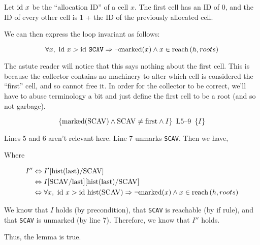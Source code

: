 Let $\id~x$ be the ``allocation ID'' of a cell $x$. The first cell has
an ID of 0, and the ID of every other cell is 1 + the ID of the
previously allocated cell.

We can then express the loop invariant as follows:

\[\forall x,\ \id~x > \id~\mathtt{SCAV} \implies
\lnot \mathrm{marked}(x) \land x \in \reach{h}{roots}\]

The astute reader will notice that this says nothing about the first
cell. This is because the collector contains no machinery to alter
which cell is considered the ``first'' cell, and so cannot free it. In
order for the collector to be correct, we'll have to abuse terminology
a bit and just define the first cell to be a root (and so not
garbage).


\begin{lemma}
  \label{lem:erlang1}
  \[\htriple{\mathrm{marked}(\mathrm{SCAV}) \land \mathrm{SCAV} \neq
    \mathrm{first} \land I}{L5--9}{I}\]

  Lines 5 and 6 aren't relevant here. Line 7 unmarks
  \texttt{SCAV}. Then we have,

  \begin{prooftree}
  \end{prooftree}

  Where

  \begin{align*}
    I'' &\iff I'[\mathrm{hist}(\mathrm{last})/\mathrm{SCAV}]\\
    &\iff
    I[\mathrm{SCAV}/\mathrm{last}][\mathrm{hist}(\mathrm{last})/\mathrm{SCAV}]\\
    &\iff \forall x,\ \id~x > \id~\mathrm{hist}(\mathrm{SCAV}) \implies
    \lnot \mathrm{marked}(x) \land x \in \reach{h}{roots}\\
  \end{align*}

  We know that $I$ holds (by precondition), that \texttt{SCAV} is
  reachable (by if rule), and that \texttt{SCAV} is unmarked (by line
  7). Therefore, we know that $I''$ holds.

  Thus, the lemma is true.
\end{lemma}

